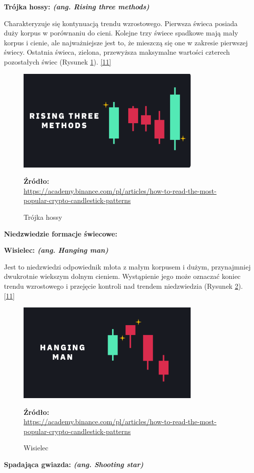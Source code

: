 \documentclass[12pt,a4paper,twoside, inzynierska]{pwr_wmat_praca_dyplomowa}
\theoremstyle{plain}
\numberwithin{theorem}{chapter}
\theoremstyle{definition}
\numberwithin{theorem}{chapter}
\begin{document}
	\noindent \textbf{Trójka hossy: \textit{(ang. Rising three methods)}}
	
	 Charakteryzuje się kontynuacją trendu wzrostowego. Pierwsza świeca posiada duży korpus w porównaniu do cieni. Kolejne trzy świece spadkowe mają mały korpus i cienie, ale najważniejsze jest to, że mieszczą się one w zakresie pierwszej świecy. Ostatnia świeca, zielona, przewyższa maksymalne wartości czterech pozostałych świec (Rysunek \ref{fig:Trójka hossy}). \hyperref[info11]{[11]}
		\vspace{12pt}
	\begin{figure}[H]
		\centering
		\includegraphics[width=0.5 \textwidth]{Trojka hossy.png}
		\caption{Trójka hossy}
		\label{fig:Trójka hossy}
		\textbf{Źródło:} \\
		\url{https://academy.binance.com/pl/articles/how-to-read-the-most-popular-crypto-candlestick-patterns}
	\end{figure}
	\vspace{12pt}
	
	\noindent \textbf{Niedzwiedzie formacje świecowe:}
	\newline
	
	\noindent \textbf{Wisielec: \textit{(ang. Hanging man)}}
	
	 Jest to niedzwiedzi odpowiednik młota z małym korpusem i dużym, przynajmniej dwukrotnie wiekszym dolnym cieniem. Wystąpienie jego może oznaczać koniec trendu wzrostowego i przejęcie kontroli nad trendem niedzwiedzia (Rysunek \ref{fig:wisielec}). \hyperref[info11]{[11]}
		\vspace{12pt}
	\begin{figure}[H]
		\centering
		\includegraphics[width=0.5 \textwidth]{Wisielec.png}
		\caption{Wisielec}
		\label{fig:wisielec}
		\textbf{Źródło:} \\
		\url{https://academy.binance.com/pl/articles/how-to-read-the-most-popular-crypto-candlestick-patterns}
	\end{figure}
	\vspace{12pt}
	\noindent \textbf{Spadająca gwiazda: \textit{(ang. Shooting star)}}
	
\end{document}
